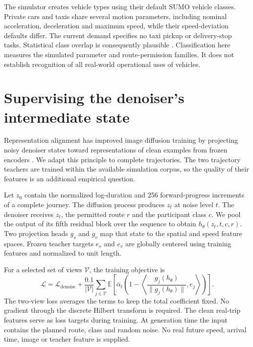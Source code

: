 The simulator creates vehicle types using their default SUMO vehicle classes. Private cars and taxis share several motion parameters, including nominal acceleration, deceleration and maximum speed, while their speed-deviation defaults differ. The current demand specifies no taxi pickup or delivery-stop tasks. Statistical class overlap is consequently plausible \cite{sumovtypes}. Classification here measures the simulated parameter and route-permission families. It does not establish recognition of all real-world operational uses of vehicles.

\section{Supervising the denoiser's intermediate state}
Representation alignment has improved image diffusion training by projecting noisy denoiser states toward representations of clean examples from frozen encoders \cite{repa}. We adapt this principle to complete trajectories. The two trajectory teachers are trained within the available simulation corpus, so the quality of their features is an additional empirical question.

Let $z_0$ contain the normalized log-duration and 256 forward-progress increments of a complete journey. The diffusion process produces $z_t$ at noise level $t$. The denoiser receives $z_t$, the permitted route $r$ and the participant class $c$. We pool the output of its fifth residual block over the sequence to obtain $h_\theta(z_t,t,c,r)$. Two projection heads $g_s$ and $g_v$ map that state to the spatial and speed feature spaces. Frozen teacher targets $e_s$ and $e_v$ are globally centered using training features and normalized to unit length.

For a selected set of views $\mathcal{V}$, the training objective is
\begin{equation}
\mathcal{L} = \mathcal{L}_{\mathrm{denoise}} +
\frac{0.1}{|\mathcal{V}|}\sum_{j\in\mathcal{V}}\mathbb{E}\left[
\bar\alpha_t\left(1-\left\langle\frac{g_j(h_\theta)}{\|g_j(h_\theta)\|},e_j\right\rangle\right)\right].
\end{equation}
The two-view loss averages the terms to keep the total coefficient fixed. No gradient through the discrete Hilbert transform is required. The clean real-trip features serve as loss targets during training. At generation time the input contains the planned route, class and random noise. No real future speed, arrival time, image or teacher feature is supplied.


